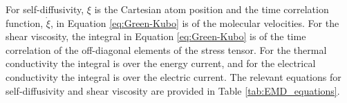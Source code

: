 \documentclass[9pt]{livecoms}
\begin{document}
For self-diffusivity, $\xi$ is the Cartesian atom position and the time correlation function, $\dot{\xi}$, in Equation \ref{eq:Green-Kubo} is of the molecular velocities. For the shear viscosity, the integral in Equation \ref{eq:Green-Kubo} is of the time correlation of the off-diagonal elements of the stress tensor. For the thermal conductivity the integral is over the energy current, and for the electrical conductivity the integral is over the electric current. The relevant equations for self-diffusivity and shear viscosity are provided in Table \ref{tab:EMD_equations}.


%	
\end{document}
